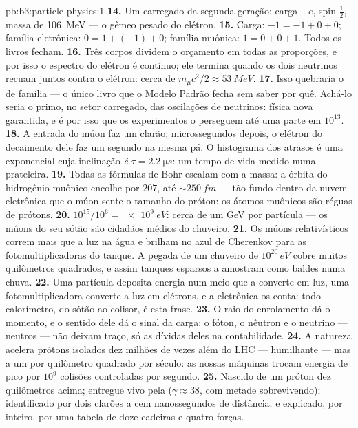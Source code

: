 \begin{solution}{pb:b3:particle-physics:1}
\textbf{14.} Um  carregado da segunda geração:
carga $-e$, spin $\tfrac12$, massa de \qty{106}{MeV} --- o
gêmeo pesado do elétron.
\textbf{15.} Carga: $-1 = -1 + 0 + 0$; família eletrônica:
$0 = 1 + (-1) + 0$; família muônica: $1 = 0 + 0 + 1$. Todos os livros
fecham.
\textbf{16.} Três corpos dividem o orçamento em todas as proporções,
e por isso o espectro do elétron é contínuo; ele termina quando os dois
neutrinos recuam juntos contra o elétron: cerca de
$m_\mu c^2/2 \approx \qty{53}{MeV}$.
\textbf{17.} Isso quebraria o  de família --- o único
livro que o Modelo Padrão fecha sem saber por quê. Achá-lo
seria o primo, no setor carregado, das oscilações de neutrinos:
física nova garantida, e é por isso que os experimentos o perseguem até
uma parte em $10^{13}$.
\textbf{18.} A entrada do múon faz um clarão; microssegundos
depois, o elétron do decaimento dele faz um segundo na mesma pá. O
histograma dos atrasos é uma exponencial cuja inclinação \emph{é}
$\tau = \qty{2.2}{\micro s}$: um tempo de vida medido numa prateleira.
\textbf{19.} Todas as fórmulas de Bohr escalam com a massa: a órbita do
hidrogênio muônico encolhe por $207$, até ${\sim}\qty{250}{fm}$ ---
tão fundo dentro da nuvem eletrônica que o múon sente o
tamanho do próton: os átomos muônicos são réguas de prótons.
\textbf{20.} $10^{15}/10^{6} = \qty{e9}{eV}$: cerca de um GeV por
partícula --- os múons do seu sótão são cidadãos médios do chuveiro.
\textbf{21.} Os múons relativísticos correm mais que a luz na água e
brilham no azul de Cherenkov para as fotomultiplicadoras do tanque. A
pegada de um chuveiro de $10^{20}\,\unit{eV}$ cobre muitos quilômetros
quadrados, e assim tanques esparsos a amostram como baldes numa
chuva.
\textbf{22.} Uma partícula deposita energia num meio que a
converte em luz, uma fotomultiplicadora converte a luz em
elétrons, e a eletrônica os conta: todo calorímetro, do
sótão ao colisor, é esta frase.
\textbf{23.} O raio do enrolamento dá o momento, e o sentido dele dá
o sinal da carga; o fóton, o nêutron e o neutrino ---
neutros --- não deixam traço, só as dívidas deles na
contabilidade.
\textbf{24.} A natureza acelera prótons isolados dez milhões de
vezes além do LHC --- humilhante --- mas a um por quilômetro
quadrado por século: as nossas máquinas trocam energia de pico por
$10^{9}$ colisões controladas por segundo.
\textbf{25.} Nascido de um próton dez quilômetros acima; entregue
vivo pela  ($\gamma \approx 38$, com metade sobrevivendo);
identificado por dois clarões a cem nanossegundos de distância; e
explicado, por inteiro, por uma tabela de doze cadeiras e quatro
forças.
\end{solution}
